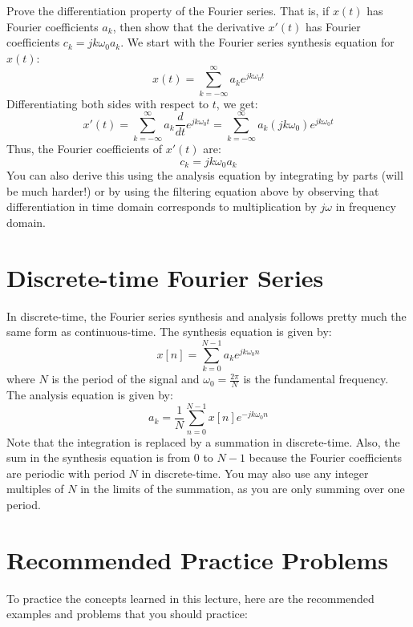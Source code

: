 \documentclass{ee102_notes}
\begin{document}
\begin{popquiz}
Prove the differentiation property of the Fourier series. That is, if $x(t)$ has Fourier coefficients $a_k$, then show that the derivative $x'(t)$ has Fourier coefficients $c_k = j k \omega_0 a_k$.
\popqsplit 
We start with the Fourier series synthesis equation for $x(t)$:
\[
x(t) = \sum_{k=-\infty}^{\infty} a_k e^{j k \omega_0 t}
\]
Differentiating both sides with respect to $t$, we get:
\[
x'(t) = \sum_{k=-\infty}^{\infty} a_k \frac{d}{dt} e^{j k \omega_0 t} = \sum_{k=-\infty}^{\infty} a_k (j k \omega_0) e^{j k \omega_0 t}
\]
Thus, the Fourier coefficients of $x'(t)$ are:
\[
c_k = j k \omega_0 a_k
\]
You can also derive this using the analysis equation by integrating by parts (will be much harder!) or by using the filtering equation above by observing that differentiation in time domain corresponds to multiplication by $j \omega$ in frequency domain.
\end{popquiz}

\section{Discrete-time Fourier Series}
In discrete-time, the Fourier series synthesis and analysis follows pretty much the same form as continuous-time. The synthesis equation is given by:
\[
x[n] = \sum_{k=0}^{N-1} a_k e^{j k \omega_0 n}
\]
where $N$ is the period of the signal and $\omega_0 = \frac{2\pi}{N}$ is the fundamental frequency. The analysis equation is given by:
\[
a_k = \frac{1}{N} \sum_{n=0}^{N-1} x[n] e^{-j k \omega_0 n}
\]
Note that the integration is replaced by a summation in discrete-time. Also, the sum in the synthesis equation is from $0$ to $N-1$ because the Fourier coefficients are periodic with period $N$ in discrete-time. You may also use any integer multiples of $N$ in the limits of the summation, as you are only summing over one period. 

\section{Recommended Practice Problems}

To practice the concepts learned in this lecture, here are the recommended examples and problems that you should practice:
\end{document}
